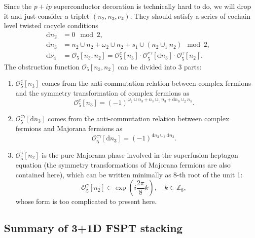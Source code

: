 \documentclass[%
 reprint,
 amsmath,amssymb,
 aps,
prb,
]{revtex4-2}
\begin{document}
Since the $p+ip$ superconductor decoration is technically hard to do, we will drop it and just consider a triplet $(n_2,n_3,\nu_4)$.
They should satisfy a series of cochain level twisted cocycle conditions 
\begin{align}
\mathrm d n_2 &= 0 \mod 2 ,\\
\mathrm d n_3 &= n_2 \cup n_2 + \omega_2 \cup n_2 + s_1 \cup (n_2 \cup_1 n_2) \mod 2 , \\
\mathrm{d} \nu_4 &= \mathcal{O}_5[n_3,n_2] =  \mathcal{O}^{c}_5[n_3] \cdot \mathcal{O}^{c\gamma}_5[\mathrm{d}n_3] \cdot \mathcal{O}^{\gamma}_5[n_2] .
\end{align}
The obstruction function $\mathcal{O}_5[n_3,n_2]$ can be divided into 3 parts: 
\begin{enumerate}
\item $\mathcal{O}^{c}_5[n_3]$ comes from the anti-commutation relation between complex fermions and the symmetry transformation of complex fermions as 
\begin{equation}
\mathcal{O}^{c}_5[n_3] = (-1)^{\omega_2 \cup n_3 + n_3 \cup_1 n_3 + \mathrm{d}n_3 \cup_2 n_3} .
\end{equation}
\item $\mathcal{O}^{c\gamma}_5[\mathrm{d}n_3]$ comes from the anti-commutation relation between complex fermions and Majorana fermions as 
\begin{equation}
\mathcal{O}^{c\gamma}_5[\mathrm{d}n_3] = (-1)^{\mathrm{d}n_3 \cup_3 \mathrm{d}n_3} .
\end{equation}
\item $\mathcal{O}^{\gamma}_5[n_2]$ is the pure Majorana phase involved in the superfusion heptagon equation (the symmetry transformations of Majorana fermions are also contained here), which can be written minimally as 8-th root of the unit 1:
\begin{equation}
\mathcal{O}^{\gamma}_5[n_2] \in \exp( i \frac{2\pi}{8} k ), \quad k \in \mathbb{Z}_8 ,
\end{equation}
whose form is too complicated to present here.
\end{enumerate}


\subsection{Summary of 3+1D FSPT stacking}
\end{document}
